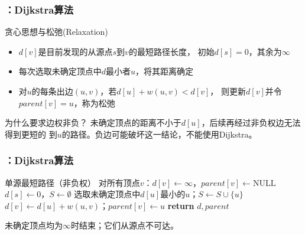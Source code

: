 \begin{frame}
    \frametitle{\insertsectionhead：Dijkstra算法}
    \begin{block}{贪心思想与松弛(Relaxation)}
        \begin{itemize}
            \item $d[v]$是目前发现的从源点$s$到$v$的最短路径长度，
                  初始$d[s]=0$，其余为$\infty$
            \item 每次选取未确定顶点中$d$最小者$u$，将其距离确定
            \item 对$u$的每条出边$(u,v)$，若$d[u]+w(u,v)<d[v]$，
                  则更新$d[v]$并令$parent[v]=u$，称为松弛
        \end{itemize}
    \end{block}
    \begin{alertblock}{为什么要求边权非负？}
        未确定顶点的距离不小于$d[u]$，后续再经过非负权边无法得到更短的
        到$u$的路径。负边可能破坏这一结论，不能使用Dijkstra。
    \end{alertblock}
\end{frame}

\begin{fragile}
    \frametitle{\insertsectionhead：Dijkstra算法}
    \begin{algorithmx}{单源最短路径（非负权）}
        \State 对所有顶点$v$：$d[v]\gets\infty$，$parent[v]\gets\mathrm{NULL}$
        \State $d[s]\gets 0$，$S\gets\emptyset$
        \State 选取未确定顶点中$d[u]$最小的$u$；$S\gets S\cup\{u\}$
        \State $d[v]\gets d[u]+w(u,v)$；$parent[v]\gets u$
        \EndIf
        \EndFor
        \EndWhile
        \State \textbf{return} $d,parent$
        \EndProcedure
    \end{algorithmx}
    未确定顶点均为$\infty$时结束；它们从源点不可达。
\end{fragile}

